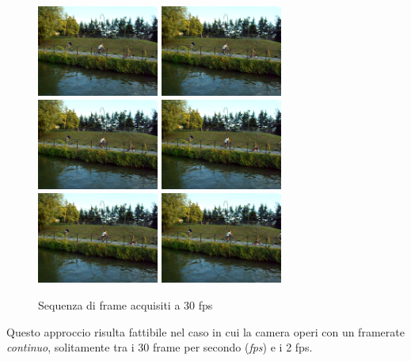\begin{figure}
	\includegraphics[width = 4cm]{./pictures/FPSalto/img0007}
	\includegraphics[width = 4cm]{./pictures/FPSalto/img0008}
	\includegraphics[width = 4cm]{./pictures/FPSalto/img0009}
	\includegraphics[width = 4cm]{./pictures/FPSalto/img0010}
	\includegraphics[width = 4cm]{./pictures/FPSalto/img0011}
	\includegraphics[width = 4cm]{./pictures/FPSalto/img0012}
	\caption{Sequenza di frame acquisiti a 30 fps}
	\label{fig:acquisizioneContinua}
\end{figure}
Questo approccio risulta fattibile nel caso in cui la camera operi con un framerate \textit{continuo}, solitamente tra i 30 frame per secondo (\textit{fps}) e i 2 fps. 

